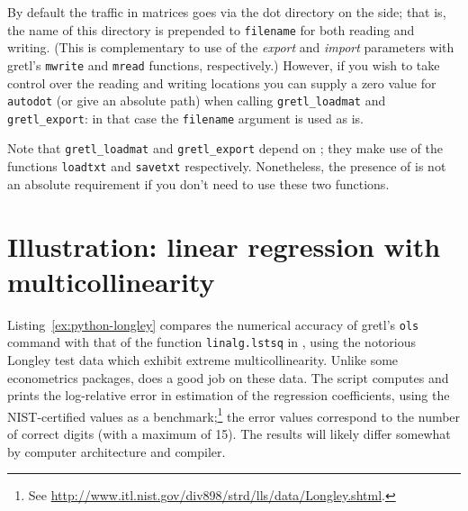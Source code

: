 By default the traffic in matrices goes via the dot directory on the
 side; that is, the name of this directory is prepended to
\texttt{filename} for both reading and writing. (This is complementary
to use of the \textsl{export} and \textsl{import} parameters with
gretl's \texttt{mwrite} and \texttt{mread} functions, respectively.)
However, if you wish to take control over the reading and writing
locations you can supply a zero value for \texttt{autodot} (or give an
absolute path) when calling \verb|gretl_loadmat| and
\verb|gretl_export|: in that case the \texttt{filename} argument is
used as is.

Note that \verb|gretl_loadmat| and \verb|gretl_export| depend on
; they make use of the functions \texttt{loadtxt} and
\texttt{savetxt} respectively. Nonetheless, the presence of
 is not an absolute requirement if you don't need
to use these two functions.

\section{Illustration: linear regression with multicollinearity}
\label{sec:Python-longley}

Listing~\ref{ex:python-longley} compares the numerical accuracy of
gretl's \texttt{ols} command with that of the function
\texttt{linalg.lstsq} in , using the notorious Longley test
data which exhibit extreme multicollinearity.  Unlike some
econometrics packages,  does a good job on these data. The
script computes and prints the log-relative error in estimation of the
regression coefficients, using the NIST-certified values as a
benchmark;\footnote{See
  \url{http://www.itl.nist.gov/div898/strd/lls/data/Longley.shtml}.}
the error values correspond to the number of correct digits (with a
maximum of 15). The results will likely differ somewhat by computer
architecture and compiler.

